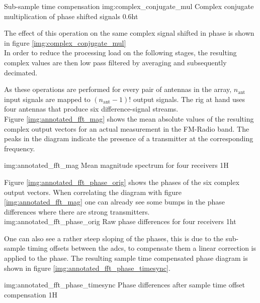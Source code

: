 \begin{subchapter}{Sub-sample time compensation}
               {img:complex_conjugate_mul}
               {Complex conjugate multiplication of phase shifted signals}
               {0.6}{ht}

  The effect of this operation on the same complex signal
  shifted in phase is shown in figure \ref{img:complex_conjugate_mul} \\

  In order to reduce the processing load on the following stages,
  the resulting complex values are then low pass filtered by
  averaging and subsequently decimated.

  As these operations are performed for every pair
  of antennas in the array, $n_\text{ant}$ input
  signals are mapped to $\left(n_\text{ant}-1\right)!$
  output signals.
  The rig at hand uses
  four antennas that produce six difference-signal streams. \\

  Figure \ref{img:annotated_fft_mag} shows the mean
  absolute values of the resulting complex output
  vectors for an actual measurement in the FM-Radio band.
  The peaks in the diagram indicate
  the presence of a transmitter at the corresponding frequency.

               {img:annotated_fft_mag}
               {Mean magnitude spectrum for four receivers}
               {1}{H}

  Figure \ref{img:annotated_fft_phase_orig} shows the phases
  of the six complex output vectors. When correlating the
  diagram with figure \ref{img:annotated_fft_mag} one can already
  see some bumps in the phase differences where there are strong transmitters. \\

               {img:annotated_fft_phase_orig}
               {Raw phase differences for four receivers}
               {1}{ht}

  One can also see a rather steep sloping of the phases,
  this is due to the sub-sample timing offsets between the
  \glspl{adc}, to compensate them a linear correction is applied
  to the phase.
  The resulting sample time compensated phase diagram is shown in
  figure \ref{img:annotated_fft_phase_timesync}.

               {img:annotated_fft_phase_timesync}
               {Phase differences after sample time offset compensation}
               {1}{H}
\end{subchapter}

